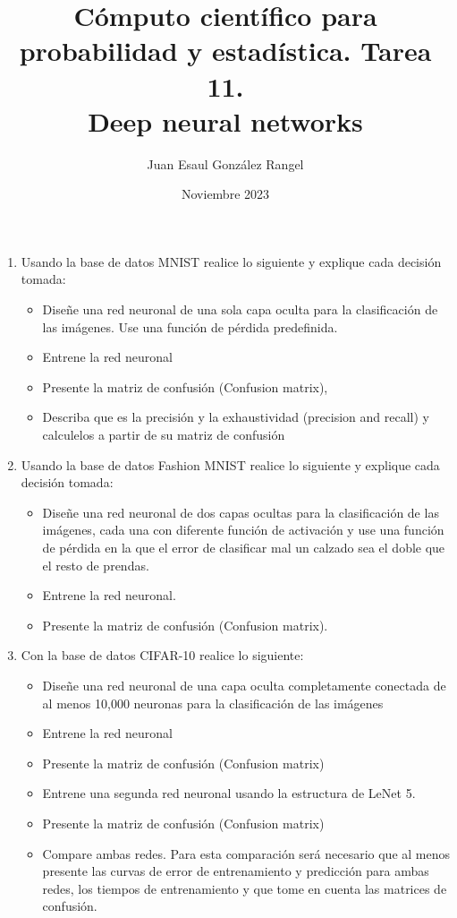 \documentclass{article}
\title{Cómputo científico para probabilidad y estadística. Tarea 11.\\
Deep neural networks}
\author{Juan Esaul González Rangel}
\date{Noviembre 2023}
\begin{document}
\maketitle


\begin{enumerate}

    \item Usando la base de datos MNIST realice lo siguiente y explique cada decisión tomada:

    \begin{itemize}
        \item Diseñe una red neuronal de una sola capa oculta para la clasificación de las imágenes. Use una función de pérdida predefinida.
        \item Entrene la red neuronal
        \item Presente la matriz de confusión (Confusion matrix),
        \item Describa que es la precisión y la exhaustividad (precision and recall) y calculelos a partir de su matriz de confusión
    \end{itemize}


    \item Usando la base de datos Fashion MNIST realice lo siguiente y explique
cada decisión tomada:

    \begin{itemize}
        \item Diseñe una red neuronal de dos capas ocultas para la clasificación de las imágenes, cada una con diferente función de activación y use una función de pérdida en la que el error de clasificar mal un calzado sea el doble que el resto de prendas.
        \item Entrene la red neuronal.
        \item Presente la matriz de confusión (Confusion matrix).
    \end{itemize}


    \item Con la base de datos CIFAR-10 realice lo siguiente:

    \begin{itemize}
        \item Diseñe una red neuronal de una capa oculta completamente conectada de al menos 10,000 neuronas para la clasificación de las imágenes
        \item Entrene la red neuronal
        \item Presente la matriz de confusión (Confusion matrix)
        \item Entrene una segunda red neuronal usando la estructura de LeNet 5.
        \item Presente la matriz de confusión (Confusion matrix)
        \item Compare ambas redes. Para esta comparación será necesario que al menos presente las curvas de error de entrenamiento y predicción para ambas redes, los tiempos de entrenamiento y que tome en cuenta las matrices de confusión.
    \end{itemize}



\end{enumerate}
\end{document}
